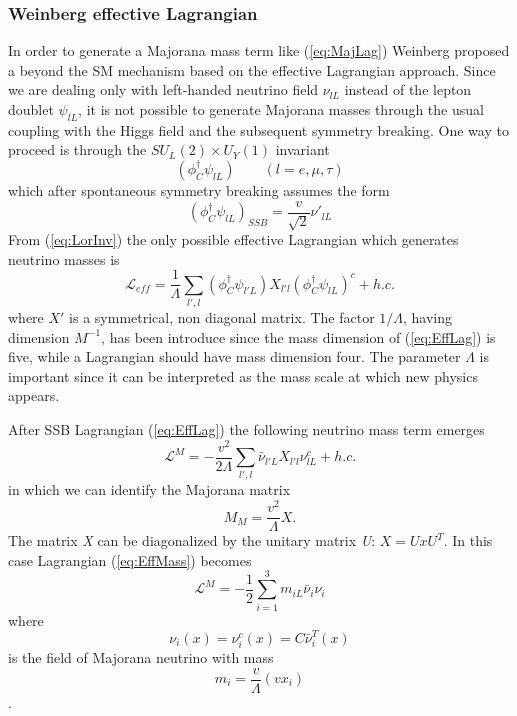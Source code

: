 \documentclass{subnucbo}
\begin{document}
\subsubsection{Weinberg effective Lagrangian}
In order to generate a Majorana mass term like (\ref{eq:MajLag}) Weinberg proposed a beyond the SM mechanism based on the effective Lagrangian approach.
Since we are dealing only with left-handed neutrino field $\nu_{lL}$ instead of the lepton doublet $\psi_{lL}$, it is not possible to generate Majorana masses through the usual coupling with the Higgs field and the subsequent symmetry breaking. 
One way to proceed is through the $SU_L(2)\times U_Y(1)$ invariant
\begin{equation}
\label{eq:LorInv}
(\phi_C^{\dagger}\psi_{lL})\qquad(l=e, \mu, \tau)
\end{equation}
which after spontaneous symmetry breaking assumes the form
\begin{equation}
(\phi_C^{\dagger}\psi_{lL})_{SSB}=\frac{v}{\sqrt{2}}\nu'_{lL}
\end{equation}
From (\ref{eq:LorInv}) the only possible effective Lagrangian which generates neutrino masses is
\begin{equation}
\label{eq:EffLag}
\mathcal{L}_{eff}=\frac{1}{\Lambda}\sum_{l',l}(\phi_C^{\dagger}\psi_{l'L})X_{l'l}(\phi_C^{\dagger}\psi_{lL})^c+h.c.
\end{equation}
where $X'$ is a symmetrical, non diagonal matrix.
The factor $1/\Lambda$, having dimension $M^{-1}$, has been introduce since the mass dimension of (\ref{eq:EffLag}) is five, while a Lagrangian should have mass dimension four.
The parameter $\Lambda$ is important since it can be interpreted as the mass scale at which new physics appears.

After SSB Lagrangian (\ref{eq:EffLag}) the following neutrino mass term emerges
\begin{equation}
\label{eq:EffMass}
\mathcal{L}^M=-\frac{v^2}{2\Lambda}\sum_{l',l}\bar{\nu}_{l'L}X_{l'l}\nu_{lL}^c+h.c.
\end{equation}
in which we can identify the Majorana matrix
\begin{equation}
M_M=\frac{v^2}{\Lambda}X. 
\end{equation}
The matrix \emph{X} can be diagonalized by the unitary matrix \emph{U}: $X=UxU^T$.
In this case Lagrangian (\ref{eq:EffMass}) becomes
\begin{equation}
\mathcal{L}^M=-\frac{1}{2}\sum_{i=1}^3m_{iL}\bar{\nu}_i\nu_i
\end{equation}
where
\begin{equation}
\label{eq:nuC}
\nu_i(x)=\nu_i^c(x)=C\bar{\nu}_i^T(x)
\end{equation}
is the field of  Majorana neutrino with mass 
\begin{equation}
\label{eq:neutMass}
m_{i}=\frac{v}{\Lambda}(vx_i)
\end{equation}.
\end{document}
